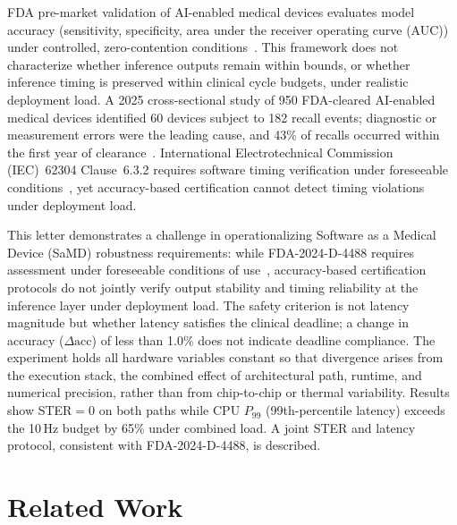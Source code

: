 \documentclass[11pt]{article}
\begin{document}
FDA pre-market validation of AI-enabled medical devices evaluates
model accuracy (sensitivity, specificity, area under the receiver operating curve (AUC))
under controlled, zero-contention conditions~\cite{fda2025}. This framework does not
characterize whether inference outputs remain within bounds, or whether inference
timing is preserved within clinical cycle budgets, under realistic deployment load.
A 2025 cross-sectional study of 950 FDA-cleared AI-enabled medical devices identified
60 devices subject to 182 recall events; diagnostic or measurement errors were the
leading cause, and 43\% of recalls occurred within the first year of
clearance~\cite{lee2025}.
International Electrotechnical Commission (IEC)~62304 Clause~6.3.2 requires software
timing verification under foreseeable conditions~\cite{iec62304}, yet accuracy-based
certification cannot detect timing violations under deployment load.

This letter demonstrates a challenge in operationalizing Software as a Medical
Device (SaMD) robustness requirements: while FDA-2024-D-4488 requires assessment
under foreseeable conditions of use~\cite{fda2025}, accuracy-based certification
protocols do not jointly verify output stability and timing reliability at the
inference layer under deployment load. The safety criterion
is not latency magnitude but whether latency satisfies the clinical deadline; a change
in accuracy ($\Delta\text{acc}$) of less than 1.0\% does not indicate deadline
compliance. The experiment holds all hardware variables constant so that divergence arises from
the execution stack, the combined effect of architectural path, runtime, and
numerical precision, rather than from chip-to-chip or thermal variability. Results show STER$=0$ on both paths while CPU
$P_{99}$ (99th-percentile latency) exceeds the 10\,Hz budget by 65\% under combined
load. A joint STER and latency protocol, consistent with FDA-2024-D-4488, is described.

\section{Related Work}
\end{document}
